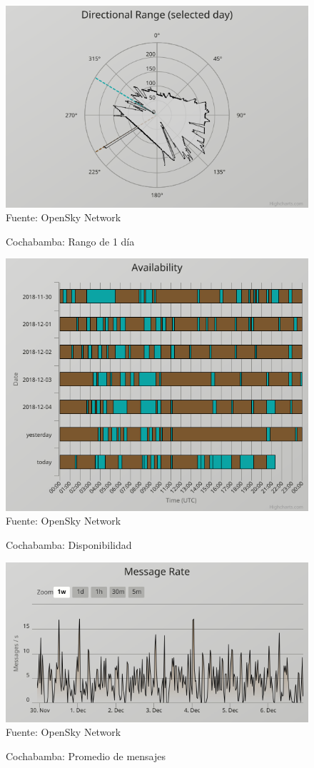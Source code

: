 \documentclass[fleqn,10pt]{SelfArx} %
\begin{document}
\begin{figure}[ht]
\caption{Cochabamba: Rango de 1 día}
\centering
\includegraphics[width=0.8\linewidth]{cbb_range.png}
\newline Fuente: OpenSky Network
\label{fig:cbb_range}
\end{figure}

\begin{figure}[ht]
\caption{Cochabamba: Disponibilidad}
\centering
\includegraphics[width=0.8\linewidth]{cbb_disp.png}
\newline Fuente: OpenSky Network
\label{fig:cbb_disp}
\end{figure}

\begin{figure}[ht]
\caption{Cochabamba: Promedio de mensajes}
\centering
\includegraphics[width=0.8\linewidth]{cbb_mes.png}
\newline Fuente: OpenSky Network
\label{fig:cbb_mes}
\end{figure}
\end{document}
